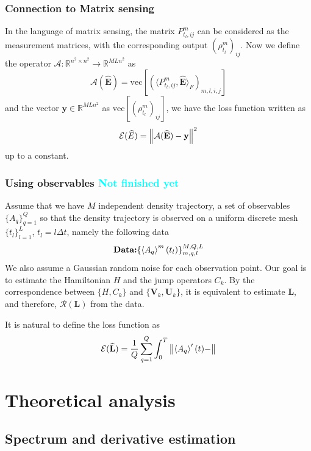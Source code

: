 \documentclass[10pt]{article}  %
\theoremstyle{plain}
\numberwithin{equation}{section}
\newcommand{\innerp}[1]{\langle{#1}\rangle}
\def\mE{\mathcal{E}}
\def\mA{\mathcal{A}}
\def\mR{\mathcal{R}}
\def\R{\mathbb{R}}
\newcommand{\bL}{\mathbf{L}}
\newcommand{\bV}{\mathbf{V}}
\newcommand{\bU}{\mathbf{U}}
\newcommand{\bE}{\mathbf{E}}
\newcommand{\by}{\mathbf{y}}
\renewcommand{\vec}{\text{vec}}
\newcommand{\QL}[1]{\textcolor{cyan}{{#1}}}
\renewcommand{\R}{\mathbb{R}}
\begin{document}
\subsubsection{Connection to Matrix sensing}
In the language of matrix sensing, the matrix $P^m_{t_l, ij}$ can be considered as the measurement matrices, with the corresponding output $(\rho^m_{t_l})_{ij}$. Now we define the operator $\mA : \R^{n^2\times n^2}\to \R^{MLn^2}$ as
\begin{equation}
	\mA(\widehat{\bE}) = \vec\left[(\innerp{P^m_{t_l, ij}, \widehat{\bE}}_F)_{m, l, i, j}\right]
\end{equation}
and the vector $\by\in \R^{MLn^2}$ as $\vec\left[(\rho^m_{t_l})_{ij}\right]$, we have the loss function written as 
\begin{equation}
	\mE(\widehat{E}) = \norm{\mA(\widehat{\bE}) - \by}^2
\end{equation}
up to a constant. 

\subsubsection{Using observables \QL{Not finished yet}}
Assume that we have $M$ independent density trajectory, a set of observables $\{A_q\}_{q = 1}^Q$ so that the density trajectory is observed on a uniform discrete mesh $\{t_l\}_{l = 1}^L$, $t_l = l \Delta t$, namely the following data
\begin{equation}
	\textbf{Data:} \{\expval{A_q}^m (t_l)\}_{m, q, l}^{M, Q, L}
\end{equation}
We also assume a Gaussian random noise for each observation point. Our goal is to estimate the Hamiltonian $H$ and the jump operators $C_k$. By the correspondence between $\{H, C_k\}$ and $\{\bV_k, \bU_k\}$, it is equivalent to estimate $\bL$, and therefore, $\mR(\bL)$ from the data. 

It is natural to define the loss function as 
\begin{equation}
	\mE(\widehat{\bL}) = \frac{1}{Q}\sum_{q = 1}^Q\int_0^T \norm{\expval{A_q}'(t) - }
\end{equation}


\section{Theoretical analysis}

\subsection{Spectrum and derivative estimation}
\end{document}
